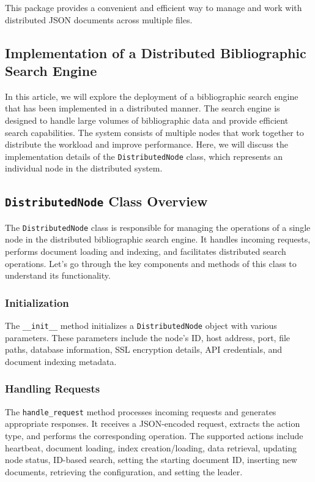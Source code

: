 \documentclass{article}
\begin{document}
This package provides a convenient and efficient way to manage and work with distributed JSON 
documents across multiple files.

\subsection{Implementation of a Distributed Bibliographic Search Engine}

In this article, we will explore the deployment of a bibliographic search engine that has been 
implemented in a distributed manner. The search engine is designed to handle large volumes of 
bibliographic data and provide efficient search capabilities. The system consists of multiple 
nodes that work together to distribute the workload and improve performance. Here, we will 
discuss the implementation details of the \texttt{DistributedNode} class, which represents an 
individual node in the distributed system.

\subsection*{\texttt{DistributedNode} Class Overview}

The \texttt{DistributedNode} class is responsible for managing the operations of a single node 
in the distributed bibliographic search engine. It handles incoming requests, performs document 
loading and indexing, and facilitates distributed search operations. Let's go through the key 
components and methods of this class to understand its functionality.


\subsubsection*{Initialization}

The \texttt{\_\_init\_\_} method initializes a \texttt{DistributedNode} object with various 
parameters. These parameters include the node's ID, host address, port, file paths, database 
information, SSL encryption details, API credentials, and document indexing metadata.


\subsubsection*{Handling Requests}

The \texttt{handle\_request} method processes incoming requests and generates appropriate 
responses. It receives a JSON-encoded request, extracts the action type, and performs the 
corresponding operation. The supported actions include heartbeat, document loading, index 
creation/loading, data retrieval, updating node status, ID-based search, setting the starting 
document ID, inserting new documents, retrieving the configuration, and setting the leader.
\end{document}
